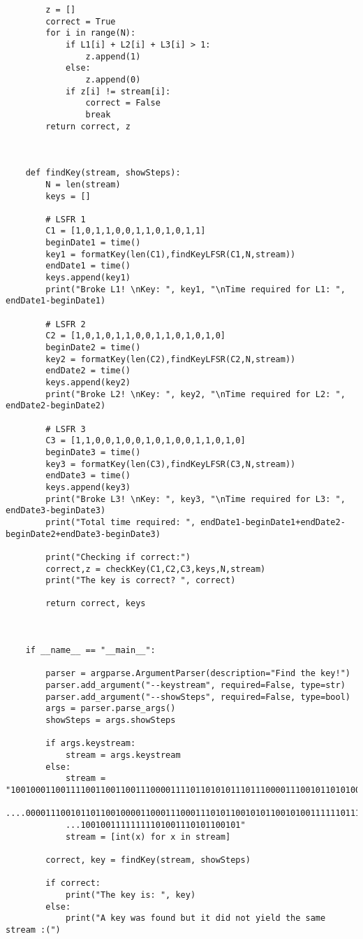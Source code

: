 \documentclass{article}
\begin{document}
\begin{verbatim}
        z = []
        correct = True
        for i in range(N):
            if L1[i] + L2[i] + L3[i] > 1:
                z.append(1)
            else:
                z.append(0)
            if z[i] != stream[i]:
                correct = False
                break
        return correct, z
    
    
    
    def findKey(stream, showSteps):
        N = len(stream)
        keys = []
    
        # LSFR 1
        C1 = [1,0,1,1,0,0,1,1,0,1,0,1,1]
        beginDate1 = time()
        key1 = formatKey(len(C1),findKeyLFSR(C1,N,stream)) 
        endDate1 = time()
        keys.append(key1)
        print("Broke L1! \nKey: ", key1, "\nTime required for L1: ", endDate1-beginDate1)
    
        # LSFR 2
        C2 = [1,0,1,0,1,1,0,0,1,1,0,1,0,1,0]
        beginDate2 = time()
        key2 = formatKey(len(C2),findKeyLFSR(C2,N,stream)) 
        endDate2 = time()
        keys.append(key2)
        print("Broke L2! \nKey: ", key2, "\nTime required for L2: ", endDate2-beginDate2)
    
        # LSFR 3
        C3 = [1,1,0,0,1,0,0,1,0,1,0,0,1,1,0,1,0]
        beginDate3 = time()
        key3 = formatKey(len(C3),findKeyLFSR(C3,N,stream)) 
        endDate3 = time()
        keys.append(key3)
        print("Broke L3! \nKey: ", key3, "\nTime required for L3: ", endDate3-beginDate3)
        print("Total time required: ", endDate1-beginDate1+endDate2-beginDate2+endDate3-beginDate3)
    
        print("Checking if correct:")
        correct,z = checkKey(C1,C2,C3,keys,N,stream)
        print("The key is correct? ", correct)
    
        return correct, keys
    
    
    
    if __name__ == "__main__":
    
        parser = argparse.ArgumentParser(description="Find the key!")
        parser.add_argument("--keystream", required=False, type=str)
        parser.add_argument("--showSteps", required=False, type=bool)
        args = parser.parse_args()
        showSteps = args.showSteps
    
        if args.keystream:
            stream = args.keystream
        else:
            stream = "100100011001111001100110011100001111011010101110111000011100101101010001011000...
            ....00001110010110110010000110001110001110101100101011001010011111101111110000100010111...
            ...10010011111111101001110101100101"
            stream = [int(x) for x in stream]
        
        correct, key = findKey(stream, showSteps)
        
        if correct:
            print("The key is: ", key)
        else:
            print("A key was found but it did not yield the same stream :(")
\end{verbatim}
\end{document}
